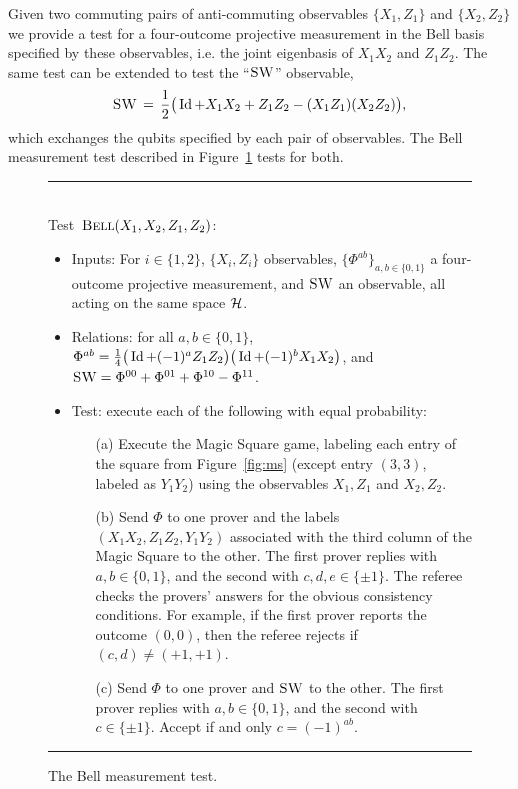 Given two commuting pairs of anti-commuting observables $\{X_1,Z_1\}$ and $\{X_2,Z_2\}$ we provide a test for a four-outcome projective measurement in the Bell basis specified by these observables, i.e. the joint eigenbasis of $X_1X_2$ and $Z_1Z_2$. The same test can be extended to test the ``$\textsc{SW}$'' observable,
\begin{equation}\label{eq:def-swap}
 \textsc{SW} \,=\, \frac{1}{2} \big( \mathop{\rm Id}\nolimits + X_1X_2 + Z_1Z_2 - (X_1Z_1)(X_2Z_2) \big),
\end{equation}
 which exchanges the  qubits specified by each pair of observables. The Bell measurement test described in Figure~\ref{fig:bell} tests for both. 


\begin{figure}[H]
\rule[1ex]{16.5cm}{0.5pt}\\
\justifying
Test~$\textsc{Bell}(X_1,X_2,Z_1,Z_2)$:
\begin{itemize}
    \item Inputs: For $i\in\{1,2\}$, $\{X_i,Z_i\}$ observables, $\{\Phi^{ab}\}_{a,b\in\{0,1\}}$ a four-outcome projective measurement, and $\textsc{SW}$ an observable, all acting on the same space $\mathcal{H}$.
    \item Relations: for all $a,b\in\{0,1\}$, $\Phi^{ab} = \frac{1}{4}\big(\mathop{\rm Id}\nolimits+(-1)^a Z_1Z_2\big)\big(\mathop{\rm Id}\nolimits+(-1)^bX_1X_2\big)$, and $\textsc{SW} = \Phi^{00} + \Phi^{01} + \Phi^{10} - \Phi^{11}$.   
    \item Test: execute each of the following with equal probability:
		\begin{enumerate}
		\item[(a)] Execute the Magic Square game, labeling each entry of the square from Figure~\ref{fig:ms} (except entry $(3,3)$, labeled as $Y_1Y_2$) using the observables $X_1,Z_1$ and $X_2,Z_2$.
		\item[(b)] Send $\Phi$ to one prover and the labels $(X_1X_2,Z_1Z_2,Y_1Y_2)$ associated with the third column of the Magic Square to the other.  The first prover replies with $a,b\in\{0,1\}$, and the second with $c,d,e\in \{\pm 1\}$. The referee checks the provers' answers for the obvious consistency conditions. For example, if the first prover reports the outcome $(0,0)$, then the referee rejects if $(c,d)\neq (+1,+1)$. 
		\item[(c)] Send $\Phi$ to one prover and $\textsc{SW}$ to the other. The first prover replies with $a,b\in\{0,1\}$, and the second with $c\in \{\pm 1\}$. Accept if and only $c=(-1)^{ab}$. 
		\end{enumerate}
\end{itemize}
\rule[2ex]{16.5cm}{0.5pt}\vspace{-.5cm}
\caption{The Bell measurement test.}
\label{fig:bell}
\end{figure}



